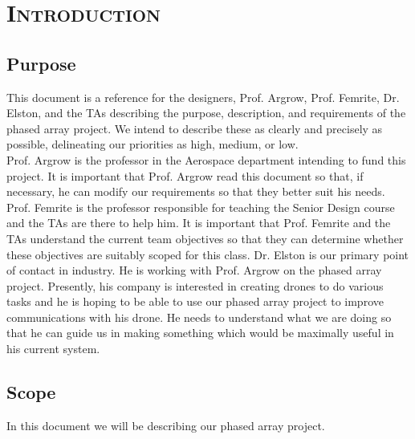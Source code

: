 \documentclass[ProjectRequirements.tex]{subfiles}
\begin{document}
\bigskip

\section{\textsc{\Large Introduction}}
	
	\subsection{Purpose}
	
	This document is a reference for the designers, Prof. Argrow, Prof. Femrite, Dr. Elston, and the TAs describing the purpose, description, and requirements of the phased array project. We intend to describe these as clearly and precisely as possible, delineating our priorities as high, medium, or low. \\

Prof. Argrow is the professor in the Aerospace department intending to fund this project. It is important that Prof. Argrow read this document so that, if necessary, he can modify our requirements so that they better suit his needs. Prof. Femrite is the professor responsible for teaching the Senior Design course and the TAs are there to help him. It is important that Prof. Femrite and the TAs understand the current team objectives so that they can determine whether these objectives are suitably scoped for this class. Dr. Elston is our primary point of contact in industry. He is working with Prof. Argrow on the phased array project. Presently, his company is interested in creating drones to do various tasks and he is hoping to be able to use our phased array project to improve communications with his drone. He needs to understand what we are doing so that he can guide us in making something which would be maximally useful in his current system.
	\subsection{Scope}
	In this document we will be describing our phased array project. 
\end{document}
